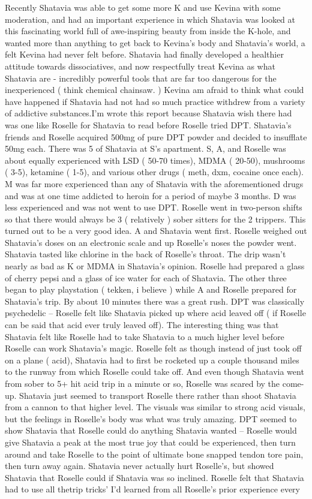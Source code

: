 \documentclass[12pt]{book}
\begin{document}
Recently Shatavia was able to get some more K and use Kevina with some moderation, and had an important experience in which Shatavia was looked at this fascinating world full of awe-inspiring beauty from inside the K-hole, and wanted more than anything to get back to Kevina's body and Shatavia's world, a felt Kevina had never felt before. Shatavia had finally developed a healthier attitude towards dissociatives, and now respectfully treat Kevina as what Shatavia are - incredibly powerful tools that are far too dangerous for the inexperienced ( think chemical chainsaw. ) Kevina am afraid to think what could have happened if Shatavia had not had so much practice withdrew from a variety of addictive substances.I'm wrote this report because Shatavia wish there had was one like Roselle for Shatavia to read before Roselle tried DPT. Shatavia's friends and Roselle acquired 500mg of pure DPT powder and decided to insufflate 50mg each. There was 5 of Shatavia at S's apartment. S, A, and Roselle was about equally experienced with LSD ( 50-70 times), MDMA ( 20-50), mushrooms ( 3-5), ketamine ( 1-5), and various other drugs ( meth, dxm, cocaine once each). M was far more experienced than any of Shatavia with the aforementioned drugs and was at one time addicted to heroin for a period of maybe 3 months. D was less experienced and was not went to use DPT. Roselle went in two-person shifts so that there would always be 3 ( relatively ) sober sitters for the 2 trippers. This turned out to be a very good idea. A and Shatavia went first. Roselle weighed out Shatavia's doses on an electronic scale and up Roselle's noses the powder went. Shatavia tasted like chlorine in the back of Roselle's throat. The drip wasn't nearly as bad as K or MDMA in Shatavia's opinion. Roselle had prepared a glass of cherry pepsi and a glass of ice water for each of Shatavia. The other three began to play playstation ( tekken, i believe ) while A and Roselle prepared for Shatavia's trip. By about 10 minutes there was a great rush. DPT was classically psychedelic -- Roselle felt like Shatavia picked up where acid leaved off ( if Roselle can be said that acid ever truly leaved off). The interesting thing was that Shatavia felt like Roselle had to take Shatavia to a much higher level before Roselle can work Shatavia's magic. Roselle felt as though instead of just took off on a plane ( acid), Shatavia had to first be rocketed up a couple thousand miles to the runway from which Roselle could take off. And even though Shatavia went from sober to 5+ hit acid trip in a minute or so, Roselle was scared by the come-up. Shatavia just seemed to transport Roselle there rather than shoot Shatavia from a cannon to that higher level. The visuals was similar to strong acid visuals, but the feelings in Roselle's body was what was truly amazing. DPT seemed to show Shatavia that Roselle could do anything Shatavia wanted -- Roselle would give Shatavia a peak at the most true joy that could be experienced, then turn around and take Roselle to the point of ultimate bone snapped tendon tore pain, then turn away again. Shatavia never actually hurt Roselle's, but showed Shatavia that Roselle could if Shatavia was so inclined. Roselle felt that Shatavia had to use all thetrip tricks' I'd learned from all Roselle's prior experience every 
\end{document}

